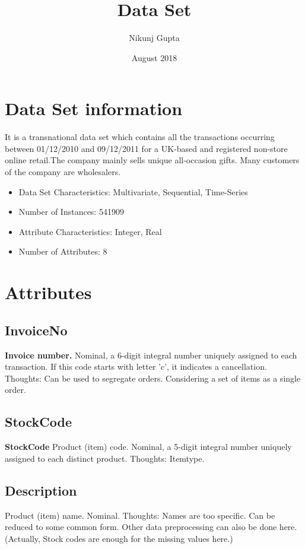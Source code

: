 \documentclass{article}
\title{Data Set}
\author{Nikunj Gupta}
\date{August 2018}
\begin{document}
\maketitle 

\section{Data Set information} 
It is a transnational data set which contains all the transactions occurring between 01/12/2010 and 09/12/2011 for a UK-based and registered non-store online retail.The company mainly sells unique all-occasion gifts. Many customers of the company are wholesalers. \newline 

\begin{itemize}
	\item Data Set Characteristics: Multivariate, Sequential, Time-Series
    \item Number of Instances: 541909 
    \item Attribute Characteristics: Integer, Real
    \item Number of Attributes: 8
\end{itemize}

\section{Attributes} 

\subsection{InvoiceNo} 
\textbf{Invoice number. }\newline 
Nominal, a 6-digit integral number uniquely assigned to each transaction. If this code starts with letter 'c', it indicates a cancellation. \newline 
Thoughts: Can be used to segregate orders. Considering a set of items as a single order.  

\subsection{StockCode} 
\textbf{StockCode } \newline 
Product (item) code. Nominal, a 5-digit integral number uniquely assigned to each distinct product. \newline 
Thoughts: Itemtype. 

\subsection{Description} 
Product (item) name. Nominal.
Thoughts: Names are too specific. Can be reduced to some common form. Other data preprocessing can also be done here. (Actually, Stock codes are enough for the missing values here.) 
\end{document}
